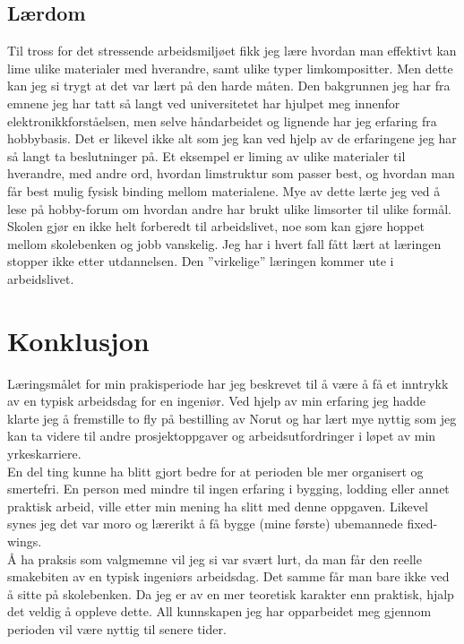 \documentclass[12pt, a4paper]{article}
\begin{document}
\subsection{Lærdom}
Til tross for det stressende arbeidsmiljøet fikk jeg lære hvordan man effektivt kan lime ulike materialer med hverandre, samt ulike typer limkompositter. Men dette kan jeg si trygt at det var lært på den harde måten. Den bakgrunnen jeg har fra emnene jeg har tatt så langt ved universitetet har hjulpet meg innenfor elektronikkforståelsen, men selve håndarbeidet og lignende har jeg erfaring fra hobbybasis. Det er likevel ikke alt som jeg kan ved hjelp av de erfaringene jeg har så langt ta beslutninger på. Et eksempel er liming av ulike materialer til hverandre, med andre ord, hvordan limstruktur som passer best, og hvordan man får best mulig fysisk binding mellom materialene. Mye av dette lærte jeg ved å lese på hobby-forum om hvordan andre har brukt ulike limsorter til ulike formål. \\
Skolen gjør en ikke helt forberedt til arbeidslivet, noe som kan gjøre hoppet mellom skolebenken og jobb vanskelig. Jeg har i hvert fall fått lært at læringen stopper ikke etter utdannelsen. Den ''virkelige'' læringen kommer ute i arbeidslivet. 

\section{Konklusjon}
Læringsmålet for min prakisperiode har jeg beskrevet til å være å få et inntrykk av en typisk arbeidsdag for en ingeniør. Ved hjelp av min erfaring jeg hadde klarte jeg å fremstille to fly på bestilling av Norut og har lært mye nyttig som jeg kan ta videre til andre prosjektoppgaver og arbeidsutfordringer i løpet av min yrkeskarriere. \\
En del ting kunne ha blitt gjort bedre for at perioden ble mer organisert og smertefri. En person med mindre til ingen erfaring i bygging, lodding eller annet praktisk arbeid, ville etter min mening ha slitt med denne oppgaven. Likevel synes jeg det var moro og lærerikt å få bygge (mine første) ubemannede fixed-wings. \\
Å ha praksis som valgmemne vil jeg si var svært lurt, da man får den reelle smakebiten av en typisk ingeniørs arbeidsdag. Det samme får man bare ikke ved å sitte på skolebenken. Da jeg er av en mer teoretisk karakter enn praktisk, hjalp det veldig å oppleve dette. All kunnskapen jeg har opparbeidet meg gjennom perioden vil være nyttig til senere tider. 

\end{document}
